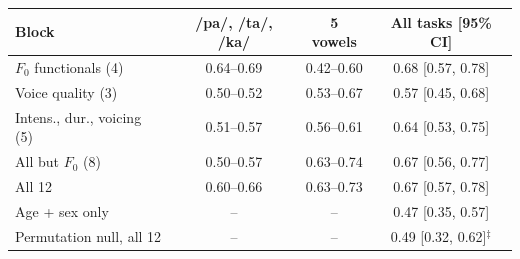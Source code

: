 \begin{tabular}{@{}lccc@{}}
\toprule
Block & /pa/, /ta/, /ka/ & 5 vowels & All tasks [95\% CI] \\
\midrule
$F_0$ functionals (4) & 0.64--0.69 & 0.42--0.60 & 0.68 [0.57, 0.78] \\
Voice quality (3) & 0.50--0.52 & 0.53--0.67 & 0.57 [0.45, 0.68] \\
Intens., dur., voicing (5) & 0.51--0.57 & 0.56--0.61 & 0.64 [0.53, 0.75] \\
All but $F_0$ (8) & 0.50--0.57 & 0.63--0.74 & 0.67 [0.56, 0.77] \\
All 12 & 0.60--0.66 & 0.63--0.73 & 0.67 [0.57, 0.78] \\
\midrule
Age + sex only & -- & -- & 0.47 [0.35, 0.57] \\
Permutation null, all 12 & -- & -- & 0.49 [0.32, 0.62]$^\ddagger$ \\
\bottomrule
\end{tabular}
